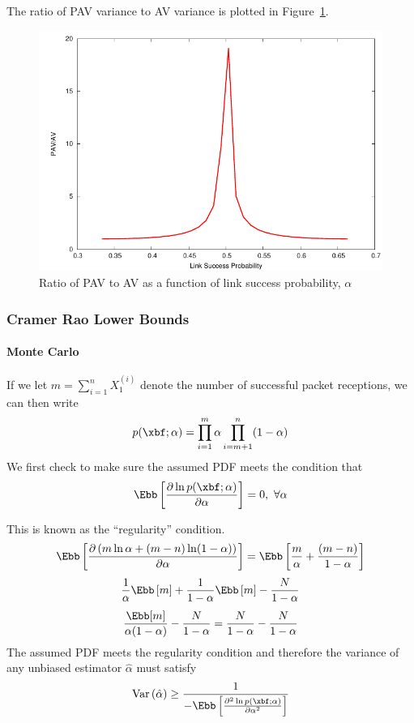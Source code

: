 \documentclass[10pt]{article}
\DeclareMathOperator{\var}{Var}
\begin{document}
The ratio of \ac{PAV} variance to \ac{AV} variance is plotted in Figure~\ref{fig:ratio}.

\begin{figure}
\centering
\includegraphics[width=0.5\columnwidth]{img/ratio}
\caption[Ratio of \acs{PAV} to \acs{AV} as a function of link success probability, $\alpha$]{Ratio of \acf{PAV} to \acf{AV} as a function of link success probability, $\alpha$}\label{fig:ratio}
\end{figure}

\subsubsection{Cramer Rao Lower Bounds}
\paragraph{Monte Carlo}
If we let $m = \displaystyle\sum_{i=1}^nX_1^{(i)}$ denote the number of successful packet receptions, we can then write
\begin{equation}
p(\xbf;\alpha)=\displaystyle\prod_{i=1}^{m}\alpha\prod_{i=m+1}^{n}(1-\alpha)\label{eq:pdf}
\end{equation}
We first check to make sure the assumed \ac{PDF} meets the condition that
\begin{equation}
\Ebb\left[\frac{\partial \ln p(\xbf;\alpha)}{\partial\alpha}\right]=0,~\forall \alpha
\end{equation}

This is known as the ``regularity'' condition.
\[
\Ebb\left[\frac{\partial \left(m\ln\alpha + (m-n)\ln(1-\alpha)\right)}{\partial\alpha}\right]=\Ebb\left[\frac{m}{\alpha}+\frac{(m-n)}{1-\alpha}\right]
\]
\[
\frac{1}{\alpha}\Ebb\left[m\right]+\frac{1}{1-\alpha}\Ebb\left[m\right]-\frac{N}{1-\alpha}
\]
\[
\frac{\Ebb[m]}{\alpha(1-\alpha)}-\frac{N}{1-\alpha}=\frac{N}{1-\alpha}-\frac{N}{1-\alpha}
\]
The assumed \ac{PDF} meets the regularity condition and therefore the variance of any unbiased estimator $\hat{\alpha}$ must satisfy
\begin{equation}
\var\left(\hat{\alpha}\right) \geq \frac{1}{-\Ebb\left[\frac{\partial^2\ln p(\xbf;\alpha)}{\partial\alpha^2}\right]}
\end{equation}
\end{document}
